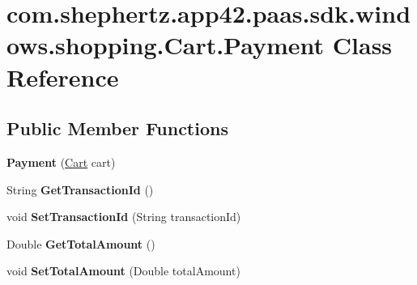 \hypertarget{classcom_1_1shephertz_1_1app42_1_1paas_1_1sdk_1_1windows_1_1shopping_1_1_cart_1_1_payment}{\section{com.\+shephertz.\+app42.\+paas.\+sdk.\+windows.\+shopping.\+Cart.\+Payment Class Reference}
\label{classcom_1_1shephertz_1_1app42_1_1paas_1_1sdk_1_1windows_1_1shopping_1_1_cart_1_1_payment}
}
\subsection*{Public Member Functions}
\begin{DoxyCompactItemize}
\item 
\hypertarget{classcom_1_1shephertz_1_1app42_1_1paas_1_1sdk_1_1windows_1_1shopping_1_1_cart_1_1_payment_a202499b044220d2ace7b2a171ef562de}{{\bfseries Payment} (\hyperlink{classcom_1_1shephertz_1_1app42_1_1paas_1_1sdk_1_1windows_1_1shopping_1_1_cart}{Cart} cart)}\label{classcom_1_1shephertz_1_1app42_1_1paas_1_1sdk_1_1windows_1_1shopping_1_1_cart_1_1_payment_a202499b044220d2ace7b2a171ef562de}

\item 
\hypertarget{classcom_1_1shephertz_1_1app42_1_1paas_1_1sdk_1_1windows_1_1shopping_1_1_cart_1_1_payment_af37d2d1f33d9065eb3a14e755b522bd9}{String {\bfseries Get\+Transaction\+Id} ()}\label{classcom_1_1shephertz_1_1app42_1_1paas_1_1sdk_1_1windows_1_1shopping_1_1_cart_1_1_payment_af37d2d1f33d9065eb3a14e755b522bd9}

\item 
\hypertarget{classcom_1_1shephertz_1_1app42_1_1paas_1_1sdk_1_1windows_1_1shopping_1_1_cart_1_1_payment_ab8f7cbf5d4293d5fb59f727cd3dc1bb4}{void {\bfseries Set\+Transaction\+Id} (String transaction\+Id)}\label{classcom_1_1shephertz_1_1app42_1_1paas_1_1sdk_1_1windows_1_1shopping_1_1_cart_1_1_payment_ab8f7cbf5d4293d5fb59f727cd3dc1bb4}

\item 
\hypertarget{classcom_1_1shephertz_1_1app42_1_1paas_1_1sdk_1_1windows_1_1shopping_1_1_cart_1_1_payment_ad6e309e582c9b23cbfd848b66cc2f0b5}{Double {\bfseries Get\+Total\+Amount} ()}\label{classcom_1_1shephertz_1_1app42_1_1paas_1_1sdk_1_1windows_1_1shopping_1_1_cart_1_1_payment_ad6e309e582c9b23cbfd848b66cc2f0b5}

\item 
\hypertarget{classcom_1_1shephertz_1_1app42_1_1paas_1_1sdk_1_1windows_1_1shopping_1_1_cart_1_1_payment_a4aec8f7ff3dce2cdb0a14136f3a66cd1}{void {\bfseries Set\+Total\+Amount} (Double total\+Amount)}\label{classcom_1_1shephertz_1_1app42_1_1paas_1_1sdk_1_1windows_1_1shopping_1_1_cart_1_1_payment_a4aec8f7ff3dce2cdb0a14136f3a66cd1}


\end{DoxyCompactItemize}
